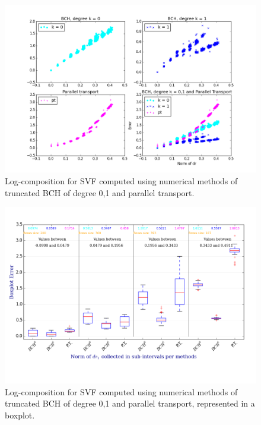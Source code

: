 \begin{figure}[!ht]
	\hspace{-3cm}
	\includegraphics[scale=0.65]{figures/SVF_bch_parallel_transport.png}
	\caption{Log-composition for SVF computed using numerical methods of truncated BCH of degree 0,1 and parallel transport.}
	\label{fig:SVF_bch_parallel_transport}
\end{figure}

\begin{figure}[!ht]
	\hspace{-2cm}
	\includegraphics[scale=0.69]{figures/SVF_boxplot.png}
	\caption{Log-composition for SVF computed using numerical methods of truncated BCH of degree 0,1 and parallel transport, represented in a boxplot.}
	\label{fig:SVF_boxplot}
\end{figure}

